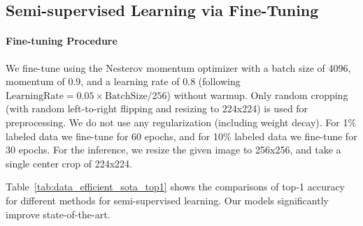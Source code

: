 \documentclass{article}
\begin{document}
\subsection{Semi-supervised Learning via Fine-Tuning}
\label{app:result_semi}

\paragraph{Fine-tuning Procedure} We fine-tune using the Nesterov momentum optimizer with a batch size of 4096, momentum of 0.9, and a learning rate of 0.8 (following $\mathrm{LearningRate}=0.05\times\mathrm{BatchSize}/256$) without warmup. Only random cropping (with random left-to-right flipping and resizing to 224x224) is used for preprocessing. We do not use any regularization (including weight decay). For 1\% labeled data we fine-tune for 60 epochs, and for 10\% labeled data we fine-tune for 30 epochs. For the inference, we resize the given image to 256x256, and take a single center crop of 224x224. 

Table~\ref{tab:data_efficient_sota_top1} shows the comparisons of top-1 accuracy for different methods for semi-supervised learning. Our models significantly improve state-of-the-art.
\end{document}
